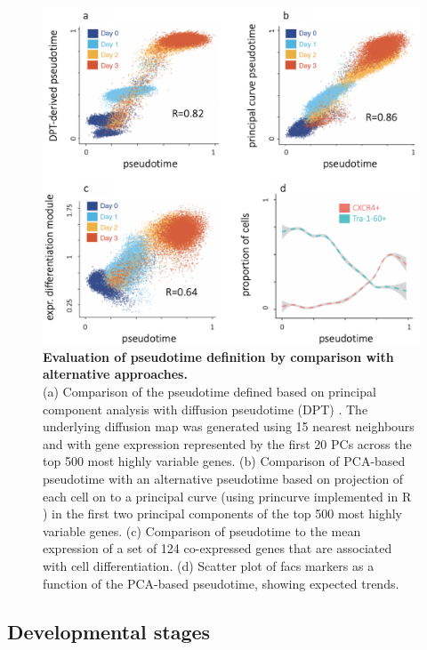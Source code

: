 \begin{figure}[htbp]
\centering
\includegraphics[width=14cm]{Chapter4/Fig/endodiff_pseudotimes.png}
\caption[Evaluation of pseudotime definition]{\textbf{Evaluation of pseudotime definition by comparison with alternative approaches.}\\
(a) Comparison of the pseudotime defined based on principal component analysis with diffusion pseudotime (DPT) \cite{haghverdi2016diffusion}. 
The underlying diffusion map was generated using 15 nearest neighbours and with gene expression represented by the first 20 PCs across the top 500 most highly variable genes.  
(b) Comparison of PCA-based pseudotime with an alternative pseudotime based on projection of each cell on to a principal curve (using princurve implemented in R \cite{hastie1989principal}) in the first two principal components of the top 500 most highly variable genes. 
(c) Comparison of pseudotime to the mean expression of a set of 124 co-expressed genes that are associated with cell differentiation. 
(d) Scatter plot of \gls{facs} markers as a function of the PCA-based pseudotime, showing expected trends.}
\label{fig:endodiff_pseudotimes}
\end{figure}

\subsection{Developmental stages}

